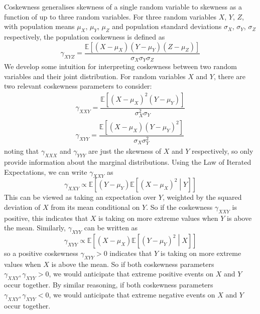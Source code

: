 \documentclass[11pt]{report} %
\begin{document}
Coskewness generalises skewness of a single random variable to skewness as a function of up to three random variables. For three random variables $X$, $Y$, $Z$, with population means $\mu_{X}$, $\mu_{Y}$, $\mu_{Z}$ and population standard deviations $\sigma_{X}$, $\sigma_{Y}$, $\sigma_{Z}$ respectively, the population coskewness is defined as
\begin{equation}
\gamma_{XYZ} = \dfrac{\mathbb{E}\left[\left(X - \mu_{X}\right)\left(Y - \mu_{Y}\right)\left(Z - \mu_{Z}\right)\right]}{\sigma_{X}\sigma_{Y}\sigma_{Z}}
\end{equation}
We develop some intuition for interpreting coskewness between two random variables and their joint distribution. For random variables $X$ and $Y$, there are two relevant coskewness parameters to consider:
\begin{gather}
\gamma_{XXY} = \dfrac{\mathbb{E}\left[\left(X - \mu_{X}\right)^{2}\left(Y - \mu_{Y}\right)\right]}{\sigma_{X}^{2}\sigma_{Y}} \\
\gamma_{XYY} = \dfrac{\mathbb{E}\left[\left(X - \mu_{X}\right)\left(Y - \mu_{Y}\right)^{2}\right]}{\sigma_{X}\sigma_{Y}^{2}}
\end{gather}
noting that $\gamma_{XXX}$ and $\gamma_{YYY}$ are just the skewness of $X$ and $Y$ respectively, so only provide information about the marginal distributions. Using the Law of Iterated Expectations, we can write $\gamma_{XXY}$ as
\begin{equation}
\gamma_{XXY} \propto \mathbb{E}\left[\left(Y - \mu_{Y}\right)\mathbb{E}\left[\left(X - \mu_{X}\right)^{2}\middle|Y\right]\right]
\end{equation}
This can be viewed as taking an expectation over $Y$, weighted by the squared deviation of $X$ from its mean conditional on $Y$. So if the coskewness $\gamma_{XXY}$ is positive, this indicates that $X$ is taking on more extreme values when $Y$ is above the mean. Similarly, $\gamma_{XYY}$ can be written as
\begin{equation}
\gamma_{XYY} \propto \mathbb{E}\left[\left(X - \mu_{X}\right)\mathbb{E}\left[\left(Y - \mu_{Y}\right)^{2}\middle|X\right]\right]
\end{equation}
so a positive coskewness $\gamma_{XYY} > 0$ indicates that $Y$ is taking on more extreme values when $X$ is above the mean. So if both coskewness parameters $\gamma_{XXY}, \gamma_{XYY} > 0$, we would anticipate that extreme positive events on $X$ and $Y$ occur together. By similar reasoning, if both coskewness parameters $\gamma_{XXY}, \gamma_{XYY} < 0$, we would anticipate that extreme negative events on $X$ and $Y$ occur together.
\end{document}
